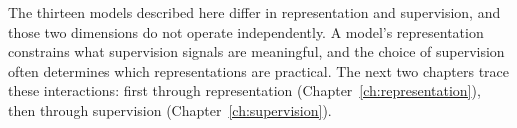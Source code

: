 The thirteen models described here differ in representation 
and supervision, and those two dimensions do not operate 
independently. A model's representation constrains what 
supervision signals are meaningful, and the choice of 
supervision often determines which representations are 
practical. The next two chapters trace these interactions: 
first through representation (Chapter~\ref{ch:representation}), 
then through supervision (Chapter~\ref{ch:supervision}).